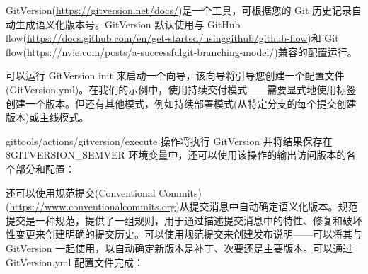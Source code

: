 

GitVersion(\url{https://gitversion.net/docs/})是一个工具，可根据您的 Git 历史记录自动生成语义化版本号。GitVersion 默认使用与 GitHub flow(\url{https://docs.github.com/en/get-started/usinggithub/github-flow})和 Git flow(\url{https://nvie.com/posts/a-successfulgit-branching-model/})兼容的配置运行。

可以运行 GitVersion init 来启动一个向导，该向导将引导您创建一个配置文件(GitVersion.yml)。在我们的示例中，使用持续交付模式——需要显式地使用标签创建一个版本。但还有其他模式，例如持续部署模式(从特定分支的每个提交创建版本)或主线模式。

gittools/actions/gitversion/execute 操作将执行 GitVersion 并将结果保存在 \$GITVERSION\_SEMVER 环境变量中，还可以使用该操作的输出访问版本的各个部分和配置：



还可以使用规范提交(Conventional Commits)(\url{https://www.conventionalcommits.org})从提交消息中自动确定语义化版本。规范提交是一种规范，提供了一组规则，用于通过描述提交消息中的特性、修复和破坏性变更来创建明确的提交历史。可以使用规范提交来创建发布说明——可以将其与 GitVersion 一起使用，以自动确定新版本是补丁、次要还是主要版本。可以通过 GitVersion.yml 配置文件完成：

